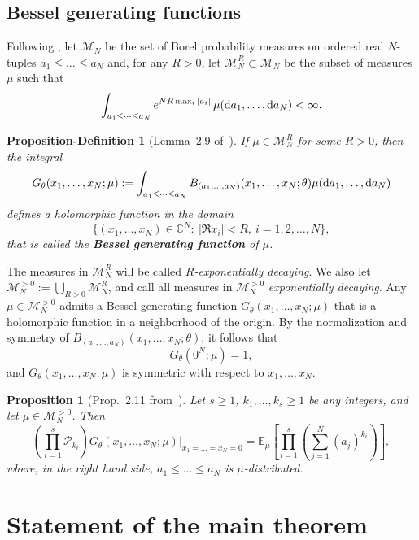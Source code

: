 \documentclass[11pt]{article}
\theoremstyle{plain}
\newtheorem{proposition}[lemma]{Proposition}
\newtheorem{proposition-definition}[lemma]{Proposition-Definition}
\renewcommand{\P}{\mathcal P}
\newcommand{\C}{\mathbb C}
\newcommand{\M}{\mathcal M}
\renewcommand{\d}{\textrm d}
\begin{document}
\subsection{Bessel generating functions}

Following \cite{BCG}, let $\M_N$ be the set of Borel probability measures on ordered real $N$-tuples $a_1\le\dots\le a_N$ and, for any $R>0$, let $\M_N^R\subset\M_N$ be the subset of measures $\mu$ such that
\begin{equation}\label{eq:technical}
\int_{a_1\le\dots\le a_N} e^{NR\max_i|a_i|}\,\mu(\d a_1,\dots,\d a_N) < \infty.
\end{equation}

\begin{proposition-definition}[Lemma~2.9 of~\cite{BCG}]\label{def:bgf}
    If $\mu\in\M_N^R$ for some $R>0$, then the integral
    \[
    G_\theta(x_1,\dots,x_N;\mu) := \int_{ a_1\le\dots\le a_N} B_{( a_1,\dots, a_N)}(x_1,\dots,x_N;\theta)\mu(\d a_1,\dots,\d a_N)
    \]
    defines a holomorphic function in the domain
    \[
    \{ (x_1,\dots,x_N)\in\C^N \colon\ |\Re x_i|<R,\ i=1,2,\dots,N \},
    \]
    that is called the \textbf{Bessel generating function} of $\mu$.
\end{proposition-definition}


The measures in $\M_N^R$ will be called \emph{$R$-exponentially decaying}.
We also let $\M_N^{>0} := \bigcup_{R>0}{\M_N^R}$, and call all measures in $\M_N^{>0}$ \emph{exponentially decaying}.
Any $\mu\in\M_N^{>0}$ admits a Bessel generating function $G_\theta(x_1,\dots,x_N;\mu)$ that is a holomorphic function in a neighborhood of the origin.
By the normalization and symmetry of $B_{(a_1,\dots,a_N)}(x_1,\dots,x_N;\theta)$, it follows that
\[
G_\theta(0^N;\mu)=1,
\]
and $G_\theta(x_1,\dots,x_N;\mu)$ is symmetric with respect to $x_1,\dots,x_N$.


\begin{proposition}[Prop.~2.11 from~\cite{BCG}]\label{prop:action_dunkl}
    Let $s\ge 1$, $k_1,\dots,k_s\ge 1$ be any integers, and let $\mu\in\M_N^{>0}$. Then
    \[
    \left( \prod_{i=1}^s \P_{k_i} \right) G_\theta(x_1,\dots,x_N;\mu) \Big|_{x_1=\dots=x_N=0} = \mathbb{E}_\mu\left[ \prod_{i=1}^s \left( \sum_{j=1}^N (a_j)^{k_i} \right) \right],
    \]
    where, in the right hand side, $a_1\le\dots\le a_N$ is $\mu$-distributed.
\end{proposition}



\section{Statement of the main theorem}
\end{document}
